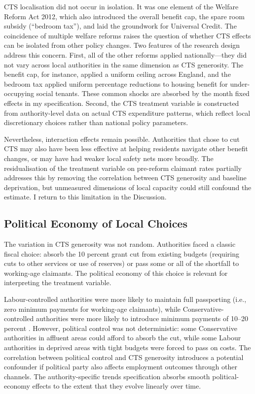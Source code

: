 \documentclass[12pt]{article}
\begin{document}
CTS localisation did not occur in isolation. It was one element of the Welfare Reform Act 2012, which also introduced the overall benefit cap, the spare room subsidy (``bedroom tax''), and laid the groundwork for Universal Credit. The coincidence of multiple welfare reforms raises the question of whether CTS effects can be isolated from other policy changes. Two features of the research design address this concern. First, all of the other reforms applied nationally---they did not vary across local authorities in the same dimension as CTS generosity. The benefit cap, for instance, applied a uniform ceiling across England, and the bedroom tax applied uniform percentage reductions to housing benefit for under-occupying social tenants. These common shocks are absorbed by the month fixed effects in my specification. Second, the CTS treatment variable is constructed from authority-level data on actual CTS expenditure patterns, which reflect local discretionary choices rather than national policy parameters.

Nevertheless, interaction effects remain possible. Authorities that chose to cut CTS may also have been less effective at helping residents navigate other benefit changes, or may have had weaker local safety nets more broadly. The residualisation of the treatment variable on pre-reform claimant rates partially addresses this by removing the correlation between CTS generosity and baseline deprivation, but unmeasured dimensions of local capacity could still confound the estimate. I return to this limitation in the Discussion.

\subsection{Political Economy of Local Choices}

The variation in CTS generosity was not random. Authorities faced a classic fiscal choice: absorb the 10 percent grant cut from existing budgets (requiring cuts to other services or use of reserves) or pass some or all of the shortfall to working-age claimants. The political economy of this choice is relevant for interpreting the treatment variable.

Labour-controlled authorities were more likely to maintain full passporting (i.e., zero minimum payments for working-age claimants), while Conservative-controlled authorities were more likely to introduce minimum payments of 10--20 percent \citep{jrf2015council}. However, political control was not deterministic: some Conservative authorities in affluent areas could afford to absorb the cut, while some Labour authorities in deprived areas with tight budgets were forced to pass on costs. The correlation between political control and CTS generosity introduces a potential confounder if political party also affects employment outcomes through other channels. The authority-specific trends specification absorbs smooth political-economy effects to the extent that they evolve linearly over time.
\end{document}
